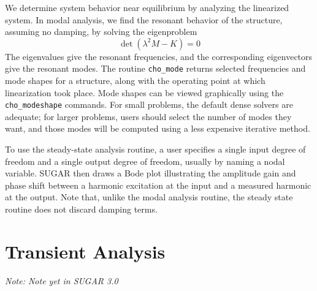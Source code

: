 We determine system behavior near equilibrium by analyzing the linearized
system.  In modal analysis, we find the resonant behavior of the structure,
assuming no damping, by solving the eigenproblem
\[
  \det(\lambda^2 M - K) = 0
\]
The eigenvalues give the resonant frequencies, and the corresponding
eigenvectors give the resonant modes.  The routine \verb|cho_mode| returns
selected frequencies and mode shapes for a structure, along with the
operating point at which linearization took place.  Mode shapes can
be viewed graphically using the \verb|cho_modeshape| commands.  For small
problems, the default dense solvers are adequate; for larger problems,
users should select the number of modes they want, and those modes
will be computed using a less expensive iterative method.

To use the steady-state analysis routine, a user specifies a single
input degree of freedom and a single output degree of freedom,
usually by naming a nodal variable.  SUGAR then draws a Bode plot
illustrating the amplitude gain and phase shift between a harmonic
excitation at the input and a measured harmonic at the output.  Note
that, unlike the modal analysis routine, the steady state routine
does not discard damping terms.



\section{Transient Analysis}

\emph{Note: Note yet in SUGAR 3.0}


